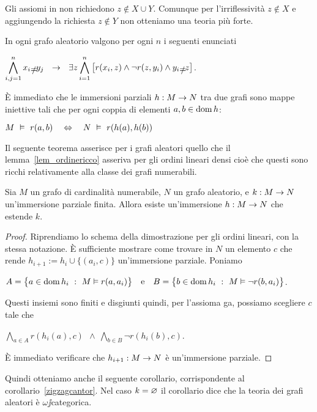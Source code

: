 Gli assiomi in  non richiedono $z\notin X\cup Y$. Comunque per l'irriflessivit\`a $z\notin X$ e aggiungendo la richiesta $z\notin Y$ non otteniamo una teoria pi\`u forte. 

\begin{exercise}\label{assioma_ga_esteso}
In ogni grafo aleatorio valgono per ogni $n$ i seguenti enunciati

\hfill$\displaystyle\bigwedge^n_{i,j=1} x_i\neq y_j\ \ \imp\ \ \E z \bigwedge^n_{i=1} \big[r(x_i,z) \wedge \neg r(z,y_i)\wedge y_i\neq z\big]$.\QED
\end{exercise}

\`E immediato che le immersioni parziali $h:M\rightarrow N$ tra due grafi sono mappe iniettive tali che per ogni coppia di elementi $a,b\in\mathop{\rm dom} h$:

\hfil $M\ \models\  r(a,b)\ \ \ \IFF\ \ \ N\ \models\  r(h(a),h(b))$

Il seguente teorema asserisce per i grafi aleatori quello che il lemma~\ref{lem_ordinericco} asseriva per gli ordini lineari densi cio\`e che questi sono ricchi relativamente alla classe dei grafi numerabili.

\begin{lemma}\label{lem_graforicco}
Sia $M$ un grafo di cardinalit\`a numerabile, $N$ un grafo aleatorio, e $k:M\rightarrow N$ un'immersione parziale finita. Allora esiste un'immersione $h:M\rightarrow N$ che estende $k$.
\end{lemma}
\begin{proof} Riprendiamo lo schema della dimostrazione per gli ordini lineari, con la stessa notazione. \`E sufficiente mostrare come trovare in $N$ un elemento $c$ che rende $h_{i+1}:=h_i\cup\{(a_i,c)\}$ un'immersione parziale. Poniamo\medskip

\hfil$A=\big\{a\in\mathop{\rm dom} h_i\ :\ M\vDash r(a,a_i)\big\}\ \ \ \textrm{e}\ \ \ B=\big\{b\in\mathop{\rm dom} h_i\ :\  M\vDash \neg r(b,a_i)\big\}$.\medskip

Questi insiemi sono finiti e disgiunti quindi, per l'assioma {\sf ga}, possiamo scegliere $c$ tale che\medskip

\hfil$\displaystyle\bigwedge_{a\in A}r(h_i(a),c)\ \ \wedge\ \bigwedge_{b\in B}\neg r(h_i(b),c)$.

\`E immediato verificare che $h_{i+1}:M\rightarrow N$ \`e un'immersione parziale.
\end{proof}

Quindi otteniamo anche il seguente corollario, corrispondente al corollario~\ref{zigzagcantor}. Nel caso $k=\varnothing$ il corollario dice che la teoria dei grafi aleatori \`e $\omega\jj$categorica.

